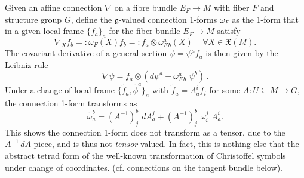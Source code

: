 \documentclass[../geometry_main.tex]{subfiles}
\begin{document}
\begin{mytheorem}
%
Given an affine connection $\nabla$ on a fibre bundle $E_F \to M$ with fiber $F$ and structure group $G$, define the $\mathfrak{g}$-valued connection 1-forms $\omega_F$ as the 1-form that in a given local frame $\{f_a\}_a$ for the fiber bundle $E_F \to M$ satisfy
\begin{equation}
     \nabla_X f_b=:\omega_F(X) f_b =: f_a\otimes \omega^a_{F\, b}(X)\,\quad \forall X \in \mathfrak{X}(M).
\end{equation}
The covariant derivative of a general section $\psi = \psi^a f_a$ is then given by the Leibniz rule 
\begin{equation}
    \nabla \psi = f_a \otimes (d\psi^a + \omega^a_{F\, b}\,\, \psi^b)\,.
\end{equation}
Under a change of local frame $\{\tilde{f}_a,\tilde{\phi}^a\}_a$ with $\tilde{f}_a= A_a^i f_i$ for some $A: U \subseteq M \to G$, the connection 1-form transforms as
\begin{equation}\label{eq:transformation_law_connection_1_form}
    \tilde{\omega}_a^b= (A^{-1})_j^b \,\, d A_a^j + (A^{-1})_j^b \,\, \omega^j_{i} \,\, A_a^i.
\end{equation}
This shows the connection 1-form does not transform as a tensor, due to the $A^{-1}\, dA$ piece, and is thus not \emph{tensor}-valued.
In fact, this is nothing else that the abstract tetrad form of the well-known transformation of Christoffel symbols under change of coordinates. (cf. connections on the tangent bundle below).


\end{mytheorem}
\end{document}
